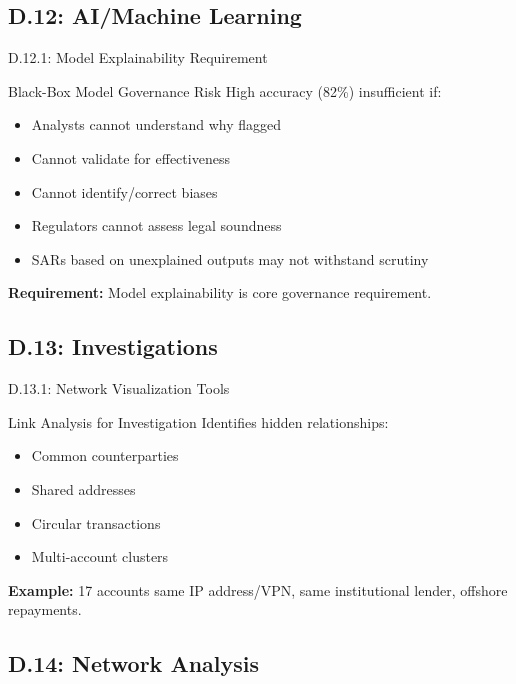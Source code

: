 \documentclass{beamer}
\begin{document}
		\subsection{D.12: AI/Machine Learning}
		
		\begin{frame}{D.12.1: Model Explainability Requirement}
			\begin{block}{Black-Box Model Governance Risk}
				High accuracy (82\%) insufficient if:
				\begin{itemize}
					\item Analysts cannot understand why flagged
					\item Cannot validate for effectiveness
					\item Cannot identify/correct biases
					\item Regulators cannot assess legal soundness
					\item SARs based on unexplained outputs may not withstand scrutiny
				\end{itemize}
			\end{block}
			\textbf{Requirement:} Model explainability is core governance requirement.
		\end{frame}
		
		\subsection{D.13: Investigations}
		
		\begin{frame}{D.13.1: Network Visualization Tools}
			\begin{block}{Link Analysis for Investigation}
				Identifies hidden relationships:
				\begin{itemize}
					\item Common counterparties
					\item Shared addresses
					\item Circular transactions
					\item Multi-account clusters
				\end{itemize}
			\end{block}
			\textbf{Example:} 17 accounts same IP address/VPN, same institutional lender, offshore repayments.
		\end{frame}
		
		\subsection{D.14: Network Analysis}
		
\end{document}
